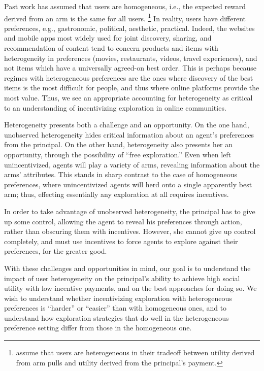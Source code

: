 Past work has assumed that users are homogeneous, i.e., the expected
reward derived from an arm is the same for all users.%
\footnote{\citet{han2015incentivizing} assume that users are
heterogeneous in their tradeoff between utility derived from arm pulls
and utility derived from the principal's payment.}
In reality, users have different preferences, e.g., gastronomic,
political, aesthetic, practical.
Indeed, the websites and mobile apps most widely used for joint discovery,
sharing, and recommendation of content tend to concern products and items 
with heterogeneity in preferences (movies, restaurants,
videos, travel experiences), and not items which have a universally
agreed-on best order.
This is perhaps because regimes with heterogeneous preferences are the
ones where discovery of the best items is the most difficult for people, 
and thus where online
platforms provide the most value.  Thus, we see an appropriate
accounting for heterogeneity as critical to an understanding of incentivizing
exploration in online communities.

Heterogeneity presents both a challenge and an opportunity.
On the one hand, unobserved heterogeneity hides critical
information about an agent's preferences from the principal.
On the other hand, heterogeneity also presents her an opportunity,
through the possibility of ``free exploration.''
Even when left unincentivized, agents will
play a variety of arms, revealing information about the arms' attributes.
This stands in sharp contrast to the case of homogeneous preferences,
where unincentivized agents will herd onto a single apparently best arm;
thus, effecting essentially any exploration at all requires incentives.

In order to take advantage of unobserved heterogeneity,
the principal has to give up some control, allowing the agent to
reveal his preferences through action, rather than obscuring them with
incentives.
However, she cannot give up control completely,
and must use incentives to force agents to explore against their
preferences, for the greater good. 

With these challenges and opportunities in mind, our goal is to understand the
impact of user heterogeneity on the principal's ability to achieve
high social utility with low incentive payments,
and on the best approaches for doing so.
We wish to understand whether incentivizing exploration with
heterogeneous preferences  is ``harder'' or ``easier'' than with
homogeneous ones,
and to understand how exploration strategies that do well in the
heterogeneous preference setting differ from those in the homogeneous one.

